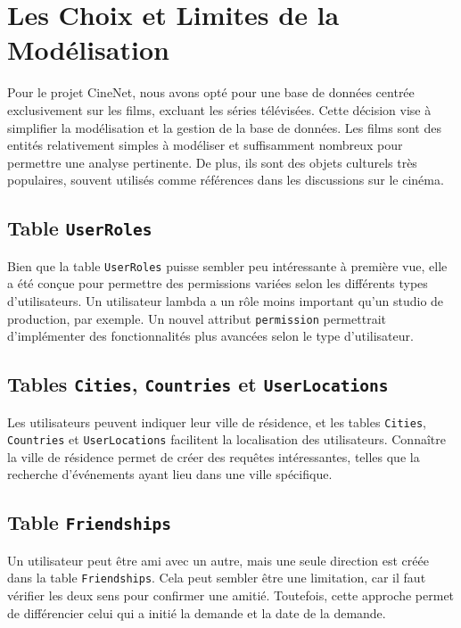 \section{Les Choix et Limites de la Modélisation}

Pour le projet CineNet, nous avons opté pour une base de données centrée exclusivement sur les films, excluant les séries télévisées. 
Cette décision vise à simplifier la modélisation et la gestion de la base de données. 
Les films sont des entités relativement simples à modéliser et suffisamment nombreux pour permettre une analyse pertinente. 
De plus, ils sont des objets culturels très populaires, souvent utilisés comme références dans les discussions sur le cinéma. 

\subsection*{Table \texttt{UserRoles}}

Bien que la table \texttt{UserRoles} puisse sembler peu intéressante à première vue, elle a été conçue pour permettre des 
permissions variées selon les différents types d'utilisateurs. Un utilisateur lambda a un rôle moins important qu'un studio 
de production, par exemple. Un nouvel attribut \texttt{permission} permettrait d'implémenter des fonctionnalités plus avancées selon 
le type d'utilisateur.

\subsection*{Tables \texttt{Cities}, \texttt{Countries} et \texttt{UserLocations}}

Les utilisateurs peuvent indiquer leur ville de résidence, et les tables \texttt{Cities}, \texttt{Countries} et \texttt{UserLocations} facilitent la localisation des utilisateurs. Connaître la ville de résidence permet de créer des requêtes intéressantes, telles que la recherche d'événements ayant lieu dans une ville spécifique.

\subsection*{Table \texttt{Friendships}}

Un utilisateur peut être ami avec un autre, mais une seule direction est créée dans la table \texttt{Friendships}. Cela peut sembler être une limitation, car il faut vérifier les deux sens pour confirmer une amitié. Toutefois, cette approche permet de différencier celui qui a initié la demande et la date de la demande.

